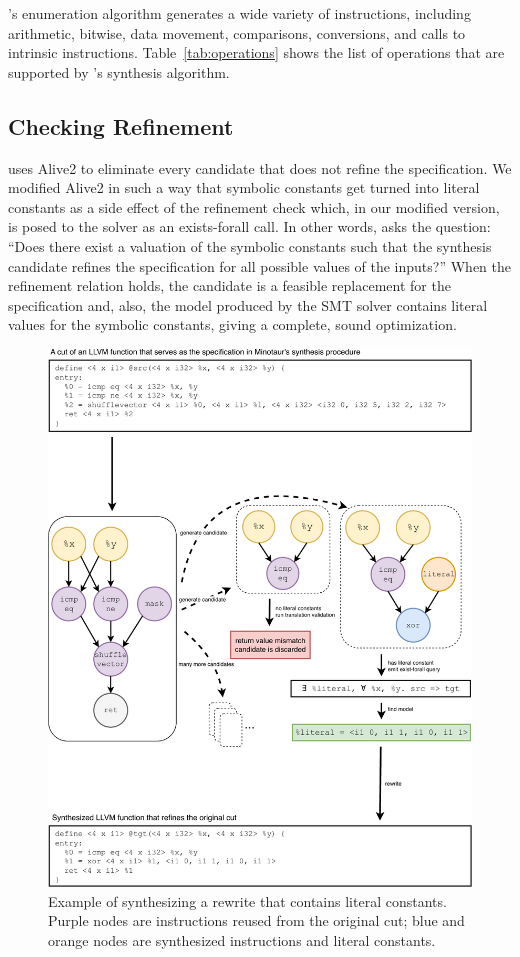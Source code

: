 \minotaur{}'s enumeration algorithm generates a wide variety of instructions,
including arithmetic, bitwise, data movement, comparisons, conversions,
and calls to intrinsic instructions.
%
Table~\ref{tab:operations} shows the list of operations that are
supported by \minotaur{}'s synthesis algorithm.



\subsection{Checking Refinement}

\minotaur{} uses Alive2 to eliminate every candidate that does not refine
the specification.
%
We modified Alive2 in such a way that symbolic constants get turned
into literal constants as a side effect of the refinement check which,
in our modified version, is posed to the solver as an exists-forall
call.
%
In other words, \minotaur{} asks the question: ``Does there exist a
valuation of the symbolic constants such that the synthesis candidate
refines the specification for all possible values of the inputs?''
%
When the refinement relation holds, the candidate is a feasible
replacement for the specification and, also, the model produced by the
SMT solver contains literal values for the symbolic constants, giving
a complete, sound optimization.


\begin {figure}[tbp]
  \centering
  \includegraphics[width=0.8\linewidth]{figures/solve_literal.pdf}
  \caption{Example of synthesizing a rewrite that contains literal
    constants.  Purple nodes are instructions reused from the original
    cut; blue and orange nodes are synthesized instructions and
    literal constants.}
  \label{fig:synthesizing}
\end{figure}

